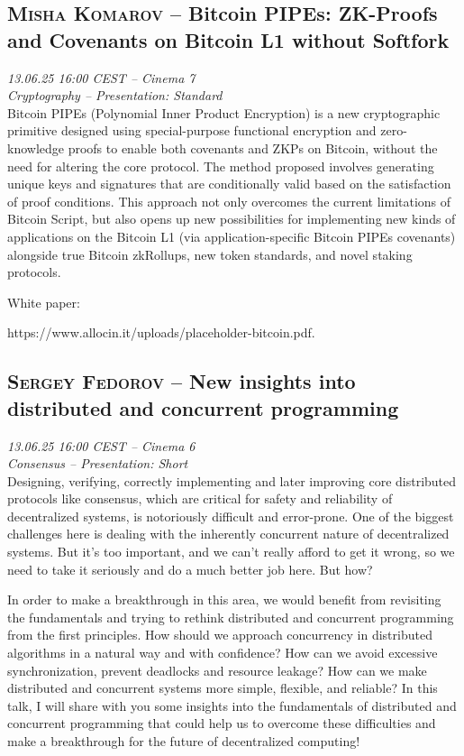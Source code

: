 \subsection {\textsc{Misha Komarov}  -- Bitcoin PIPEs: ZK-Proofs and Covenants on Bitcoin L1 without Softfork} \noindent \textit {13.06.25 16:00 CEST -- Cinema 7\\ Cryptography -- Presentation: Standard}\\[1em] Bitcoin PIPEs (Polynomial Inner Product Encryption) is a new cryptographic primitive designed using special-purpose functional encryption and zero-knowledge proofs to enable both covenants and ZKPs on Bitcoin, without the need for altering the core protocol. The method proposed involves generating unique keys and signatures that are conditionally valid based on the satisfaction of proof conditions. This approach not only overcomes the current limitations of Bitcoin Script, but also opens up new possibilities for implementing new kinds of applications on the Bitcoin L1 (via application-specific Bitcoin PIPEs covenants) alongside true Bitcoin zkRollups, new token standards, and novel staking protocols.

White paper:

https://www.allocin.it/uploads/placeholder-bitcoin.pdf.

\clearpage
\subsection {\textsc{Sergey Fedorov}  -- New insights into distributed and concurrent programming} \noindent \textit {13.06.25 16:00 CEST -- Cinema 6\\ Consensus -- Presentation: Short}\\[1em] Designing, verifying, correctly implementing and later improving core distributed protocols like consensus, which are critical for safety and reliability of decentralized systems, is notoriously difficult and error-prone. One of the biggest challenges here is dealing with the inherently concurrent nature of decentralized systems. But it’s too important, and we can’t really afford to get it wrong, so we need to take it seriously and do a much better job here. But how?

In order to make a breakthrough in this area, we would benefit from revisiting the fundamentals and trying to rethink distributed and concurrent programming from the first principles. How should we approach concurrency in distributed algorithms in a natural way and with confidence? How can we avoid excessive synchronization, prevent deadlocks and resource leakage? How can we make distributed and concurrent systems more simple, flexible, and reliable? In this talk, I will share with you some insights into the fundamentals of distributed and concurrent programming that could help us to overcome these difficulties and make a breakthrough for the future of decentralized computing!

